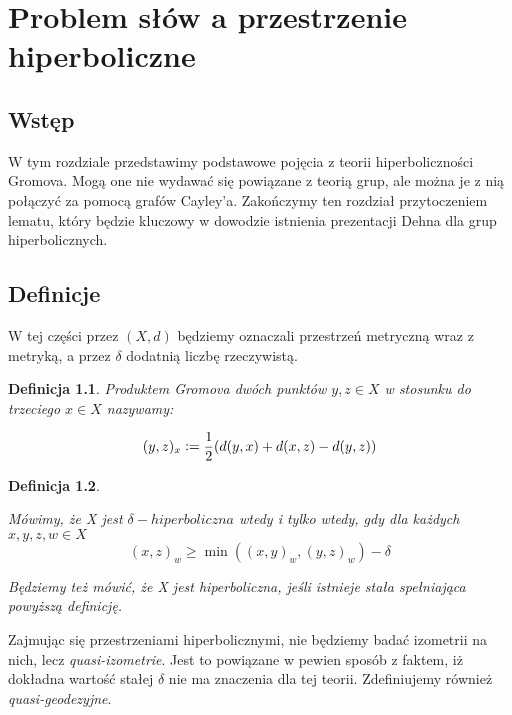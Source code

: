 \documentclass[licencjacka]{pracamgr}
\newcommand{\defeq}{\vcentcolon=}
\newtheorem{defi}{Definicja}[section]
\begin{document}
\chapter{Problem słów a przestrzenie hiperboliczne}\label{hyperbolicity}

\section{Wstęp}

W tym rozdziale przedstawimy podstawowe pojęcia z teorii hiperboliczności Gromova. Mogą one nie wydawać się powiązane z teorią grup, ale można je z nią połączyć za pomocą grafów Cayley'a. Zakończymy ten rozdział przytoczeniem lematu, który będzie kluczowy w dowodzie istnienia prezentacji Dehna dla grup hiperbolicznych.

\section{Definicje}

W tej części przez $(X, d)$ będziemy oznaczali przestrzeń metryczną wraz z metryką, a przez $\delta$ dodatnią liczbę rzeczywistą.

\begin{defi}\label{Gromov product}
Produktem Gromova dwóch punktów $y, z \in X$ w stosunku do trzeciego $x \in X$ nazywamy:

\[ (y,z)_{x} \defeq \frac{1}{2} (d(y, x) + d(x, z) - d(y, z)) \]

\end{defi}

\begin{defi}\label{Hyperbolic space}

Mówimy, że X jest $\delta-hiperboliczna$ wtedy i tylko wtedy, gdy dla każdych $x, y, z, w \in X$
\[ (x,z)_{w} \geq \min((x,y)_{w}, (y, z)_{w}) - \delta \]

Będziemy też mówić, że X jest hiperboliczna, jeśli istnieje stała spełniająca powyższą definicję.

\end{defi}

Zajmując się przestrzeniami hiperbolicznymi, nie będziemy badać izometrii na nich, lecz \textit{quasi-izometrie}. Jest to powiązane w pewien sposób z faktem, iż dokładna wartość stałej $\delta$ nie ma znaczenia dla tej teorii. Zdefiniujemy również \textit{quasi-geodezyjne}.
\end{document}
